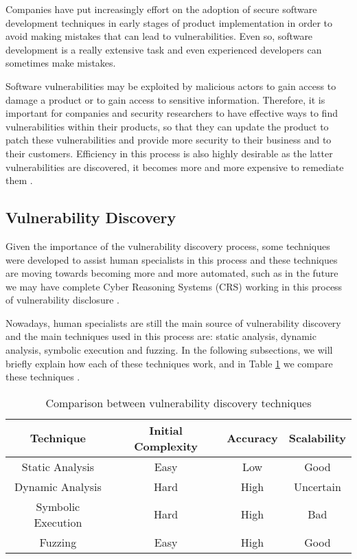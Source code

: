 Companies have put increasingly effort on the adoption of secure software development techniques in early stages of product implementation in order to avoid making mistakes that can lead to vulnerabilities. Even so, software development is a really extensive task and even experienced developers can sometimes make mistakes.

Software vulnerabilities may be exploited by malicious actors to gain access to damage a product or to gain access to sensitive information. Therefore, it is important for companies and security researchers to have effective ways to find vulnerabilities within their products, so that they can update the product to patch these vulnerabilities and provide more security to their business and to their customers. Efficiency in this process is also highly desirable as the latter vulnerabilities are discovered, it becomes more and more expensive to remediate them \cite{soft-eng-economics}.

\subsection{Vulnerability Discovery}
\label{subsec:vuln-disc}

Given the importance of the vulnerability discovery process, some techniques were developed to assist human specialists in this process and these techniques are moving towards becoming more and more automated, such as in the future we may have complete Cyber Reasoning Systems (CRS) working in this process of vulnerability disclosure \cite{crs}.

Nowadays, human specialists are still the main source of vulnerability discovery and the main techniques used in this process are: static analysis, dynamic analysis, symbolic execution and fuzzing. In the following subsections, we will briefly explain how each of these techniques work, and in Table \ref{tab:disc-techniques} we compare these techniques \cite{fuzzing}.

\begin{table}[h]
    \centering
    \caption{Comparison between vulnerability discovery techniques}
        \begin{tabular}{|c|c|c|c|}
        \hline
        \textbf{Technique}   & \textbf{Initial Complexity} & \textbf{Accuracy} & \textbf{Scalability} \\ \hline
        Static Analysis    & Easy      & Low   & Good         \\ \hline
        Dynamic Analysis   & Hard      & High  & Uncertain    \\ \hline
        Symbolic Execution & Hard      & High  & Bad          \\ \hline
        Fuzzing            & Easy      & High  & Good         \\ \hline
        \end{tabular}%
    \label{tab:disc-techniques}
\end{table}

